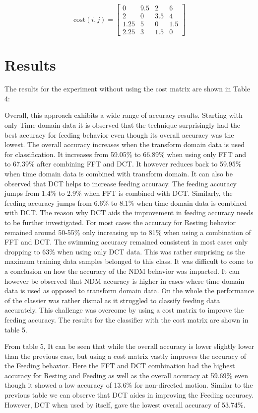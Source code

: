 \documentclass[conference]{IEEEtran}
\begin{document}
$$
\mathrm{cost}(i, j) = \begin{bmatrix}
	0 & 9.5 & 2 & 6 \\
	2 & 0 & 3.5 & 4 \\
	1.25 & 5 & 0 & 1.5 \\
	2.25 & 3 & 1.5 & 0
\end{bmatrix}
$$

\section{Results}

The results for the experiment without using the cost matrix are shown in Table 4:


Overall, this approach exhibits a wide range of accuracy results. Starting with only Time domain data it is observed that the technique surprisingly had the best accuracy for feeding behavior even though its overall accuracy was the lowest. The overall accuracy increases when the transform domain data is used for classification. It increases from 59.05\% to 66.89\% when using only FFT and to 67.39\% after combining FFT and DCT. It however reduces back to 59.95\% when time domain data is combined with transform domain. It can also be observed that DCT helps to increase feeding accuracy. The feeding accuracy jumps from 1.4\% to 2.9\% when FFT is combined with DCT. Similarly, the feeding accuracy jumps from 6.6\% to 8.1\% when time domain data is combined with DCT. The reason why DCT aids the improvement in feeding accuracy needs to be further investigated. For most cases the accuracy for Resting behavior remained around 50-55\% only increasing up to 81\% when using a combination of FFT and DCT. The swimming accuracy remained consistent in most cases only dropping to 63\% when using only DCT data. This was rather surprising as the maximum training data samples belonged to this class. It was difficult to come to a conclusion on how the accuracy of the NDM behavior was impacted. It can however be observed that NDM accuracy is higher in cases where time domain data is used as opposed to transform domain data. On the whole the performance of the classier was rather dismal as it struggled to classify feeding data accurately. This challenge was overcome by using a cost matrix to improve the feeding accuracy. The results for the classifier with the cost matrix are shown in table 5.


From table 5, It can be seen that while the overall accuracy is lower slightly lower than the previous case, but using a cost matrix vastly improves the accuracy of the Feeding behavior. Here the FFT and DCT combination had the highest accuracy for Resting and Feeding as well as the overall accuracy at 59.69\% even though it showed a low accuracy of 13.6\% for non-directed motion. Similar to the previous table we can observe that DCT aides in improving the Feeding accuracy. However, DCT when used by  itself,  gave the lowest overall accuracy of 53.74\%. 
\end{document}

